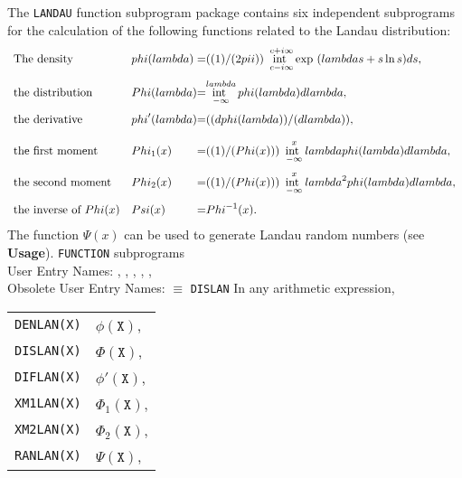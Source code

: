                
             
\Submitter{}              
            
The {\tt LANDAU} function subprogram package contains six independent
subprograms for the calculation of the following functions related to
the Landau distribution:
$$\begin{array}{ll@{ \quad = \quad }l}
\mbox{{\rm The density}}           & \phi(\lambda)
& \displaystyle \frac{1}{2\pi i} \
\int_{c-i\infty}^{c+i\infty} \exp(\lambda s + s \ln s) ds,
\\ [4mm]
\mbox{{\rm the distribution}}      & \Phi(\lambda)
& \displaystyle \int_{-\infty}^\lambda \phi(\lambda) d \lambda, \\[4mm]
\mbox{{\rm the derivative}}        & \phi'(\lambda)
& \displaystyle \frac{d\phi(\lambda)}{d\lambda},\\ [4mm]
\mbox{{\rm the first moment}}     & \Phi_1(x)
& \displaystyle \frac{1}{\Phi(x)} \ \int_{-\infty}^x \lambda
\phi(\lambda) d \lambda, \\ [4mm]
\mbox{{\rm the second moment}}     & \Phi_2(x)
& \displaystyle \frac{1}{\Phi(x)} \ \int_{-\infty}^x \lambda^2
\phi(\lambda) d \lambda,\\  [4mm]
\mbox{{\rm the inverse of} $\Phi(x)$}& \Psi(x)
& \displaystyle \Phi^{-1}(x).
\end{array}$$
The function $\Psi(x)$ can be used to generate Landau random numbers
(see {\bf Usage}).
\Structure
{\tt FUNCTION} subprograms \\
User Entry Names: , , ,
                  , ,  \\
Obsolete User Entry Names: \Rdef{DSTLAN} $\equiv$ {\tt DISLAN}
\Usage
In any arithmetic expression,
\begin{center} \begin{tabular}{r@{\qquad has the value \qquad}l}
{\tt DENLAN(X)} & $\phi(\mathtt{X})$, \\
{\tt DISLAN(X)} & $\Phi(\mathtt{X})$, \\
{\tt DIFLAN(X)} & $\phi'(\mathtt{X})$, \\
{\tt XM1LAN(X)} & $\Phi_1(\mathtt{X})$,\\
{\tt XM2LAN(X)} & $\Phi_2(\mathtt{X})$,\\
{\tt RANLAN(X)} & $\Psi(\mathtt{X})$,
\end{tabular} \end{center}
